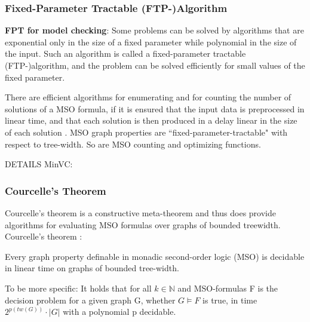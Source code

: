 \documentclass[a4paper, 12pt, bibliography=totoc]{scrartcl}
\begin{document}
\subsubsection{Fixed-Parameter Tractable (FTP-)Algorithm}

\textbf{FPT for model checking}:
Some problems can be solved by algorithms that are exponential only in the size of a fixed parameter while polynomial in the size of the input. Such an algorithm is called a fixed-parameter tractable (FTP-)algorithm, and the problem can be solved efficiently for small values of the fixed parameter. \cite{ParamCompGrohe}

There are efficient algorithms for enumerating and for counting the number of solutions of a MSO formula, if it is ensured that the input data is preprocessed in linear time, and that each solution is then produced in a delay linear in the size of each solution \cite{MSOQueriesGuillaume, ARNBORG1991308}.
MSO graph properties are ``fixed-parameter-tractable" with respect to tree-width. So are MSO counting and optimizing functions. \cite{CourcelleGROW}

DETAILS MinVC: 

\subsubsection{Courcelle's Theorem}
 Courcelle's theorem is a constructive meta-theorem and thus does provide algorithms for evaluating MSO formulas over graphs of bounded treewidth.
Courcelle's theorem \cite[p. 54]{Courcelle2012}:
\begin{thm}
	Every graph property definable in monadic second-order logic (MSO) is decidable in linear time on graphs of bounded tree-width. 

\end{thm}

\noindent
To be more specific: It holds that for all $k \in \mathbb{N}$ and MSO-formulas F is the decision problem for a given graph G, whether $G \models F$ is true, in time $2^{p(tw(G))} \cdot |G|$ with a polynomial p decidable.\smallskip 
\end{document}
